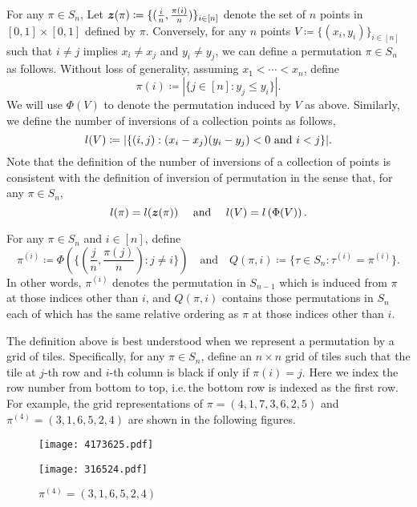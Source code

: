 For  any $\pi \in S_n$,  Let $\boldsymbol{z}(\pi) \coloneqq \{(\frac{i}{n}, \frac{\pi(i)}{n})\}_{i \in [n]}$ denote the set of $n$ points in $[0,1] \times [0,1]$ defined by $\pi$. Conversely, for any $n$ points $V \coloneqq\{(x_i, y_i)\}_{i \in [n]}$ such that $i \neq j$ implies $x_i \neq x_j$ and $y_i \neq y_j$, we can define a permutation $\pi \in S_n$ as follows. Without loss of generality, assuming $x_1 < \cdots < x_n$, define
\[
\pi(i) \coloneqq |\{j \in [n] : y_j \le y_i\}|.
\]
We will use $\Phi(V)$ to denote the permutation induced by $V$ as above. Similarly, we define the number of inversions of a collection points as follows,
\[
l(V) \coloneqq |\{(i, j) : (x_i - x_j)(y_i - y_j) < 0 \text{ and }  i < j \}|.
\]
Note that the definition of the number of inversions of a collection of points is consistent with the definition of inversion of permutation in the sense that, for any $\pi \in S_n$,
\[
l(\pi) = l(\boldsymbol{z}(\pi)) \quad \text{ and }\quad l(V) = l\left(\Phi(V)\right).
\]
\begin{definition}
For any $\pi \in S_n$ and $i \in [n]$, define 
\[
\textstyle\pi^{(i)} \coloneqq \Phi\left(\Big\{\left(\frac{j}{n}, \frac{\pi(j)}{n}\right): j \neq i\Big\}\right) \quad \text{and} \quad Q(\pi, i) \coloneqq \{ \tau \in S_n: \tau^{(i)} = \pi^{(i)} \}.
\]
In other words, $\pi^{(i)}$ denotes the permutation in $S_{n-1}$ which is induced from $\pi$ at those indices other than $i$, and $Q(\pi, i)$ contains those permutations in $S_n$ each of which has the same relative ordering as $\pi$ at those indices other than $i$.
\end{definition}
The definition above is best understood when we represent a permutation by a grid of tiles. Specifically, for any $\pi \in S_n$, define an $n\times n$ grid of tiles such that the tile at $j$-th row and $i$-th column is black if only if $\pi(i) = j$. Here we index the row number from bottom to top, i.e.\,the bottom row is indexed as the first row. For example, the grid representations of $\pi = (4,1,7,3,6,2,5)$ and $\pi^{(4)} = (3,1,6,5,2,4)$ are shown in the following figures.
\begin{figure}[ht]
\hfill
\begin{minipage}[b]{0.4\textwidth} \centering
\texttt{[image: 4173625.pdf]}
\caption*{\small$\pi = (4,1,7,3,6,2,5)$}
\end{minipage}
\hfill
\begin{minipage}[b]{0.4\textwidth} \centering
\texttt{[image: 316524.pdf]}
\caption*{\small$\pi^{(4)} = (3,1,6,5,2,4)$}
\end{minipage}
\hfill
\end{figure}

